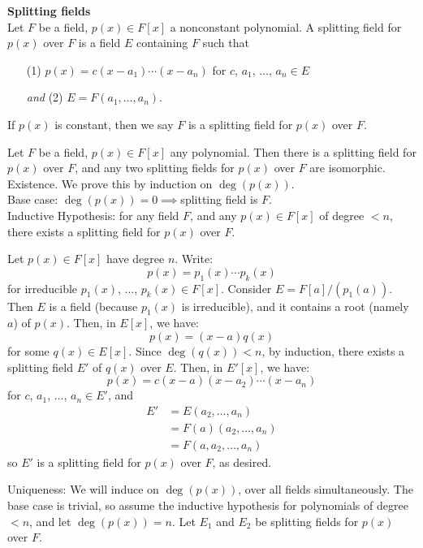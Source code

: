 \textbf{Splitting fields} \\
 Let $F$ be a field, $p(x)\in F[x]$ a nonconstant polynomial.  A splitting field for $p(x)$ over $F$ is a field $E$ containing $F$ such that
\begin{enumerate}%
\item[(1)] $p(x)=c(x-a_1)\dotsm(x-a_n)$ for $c$, $a_1$, $\dotsc$, $a_n\in E$
\item[\emph{and} (2)] $E=F(a_1,\dotsc,a_n)$.
\end{enumerate}
If $p(x)$ is constant, then we say $F$ is a splitting field for $p(x)$ over $F$.

\thm Let $F$ be a field, $p(x)\in F[x]$ any polynomial.  Then there is a splitting field for $p(x)$ over $F$, and any two splitting fields for $p(x)$ over $F$ are isomorphic. \\
\pf Existence.  We prove this by induction on $\deg(p(x))$. \\
Base case: $\deg(p(x))=0\implies{}$splitting field is $F$. \\
Inductive Hypothesis: for any field $F$, and any $p(x)\in F[x]$ of degree $<n$, there exists a splitting field for $p(x)$ over $F$.

Let $p(x)\in F[x]$ have degree $n$.  Write: %
\[ p(x) = p_1(x)\dotsm p_k(x) \]
for irreducible $p_1(x)$, $\dotsc$, $p_k(x)\in F[x]$.  Consider $E=F[a]/(p_1(a))$.  Then $E$ is a field (because $p_1(x)$ is irreducible), and it contains a root (namely $a$) of $p(x)$.  Then, in $E[x]$, we have:
\[ p(x) = (x-a)q(x) \]
for some $q(x)\in E[x]$.  Since $\deg(q(x))<n$, by induction, there exists a splitting field $E'$ of $q(x)$ over $E$.  Then, in $E'[x]$, we have:
\[ p(x) = c(x-a)(x-a_2)\dotsm(x-a_n) \]
for $c$, $a_1$, $\dotsc$, $a_n\in E'$, and
\begin{align*}
E' &= E(a_2,\dotsc,a_n) \\
&= F(a)(a_2,\dotsc,a_n) \\
&= F(a,a_2,\dotsc,a_n)
\end{align*}
so $E'$ is a splitting field for $p(x)$ over $F$, as desired.

Uniqueness: We will induce on $\deg(p(x))$, over all fields simultaneously.  The base case is trivial, so assume the inductive hypothesis for polynomials of degree $<n$, and let $\deg(p(x))=n$.  Let $E_1$ and $E_2$ be splitting fields for $p(x)$ over $F$.

